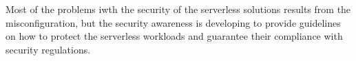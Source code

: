Most of the problems iwth the security of the serverless solutions results from the misconfiguration, but the security awareness is developing to provide guidelines on how to protect the serverless workloads and guarantee their compliance with security regulations.







